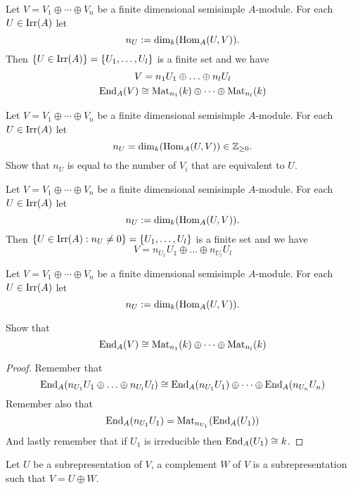 \begin{prop}
Let \(V=V_{1}\oplus \cdots \oplus V_{n}\) be a finite dimensional semisimple \(A\)-module. For each \(U\in \operatorname{Irr}(A)\) let
\[
n_U:=\dim_{k}(\operatorname{Hom}_A(U,V)).
\]
Then \(\{U\in \operatorname{Irr}(A)\}=\{U_{1},\ldots ,U_{l}\}\) is a finite set and we have
\begin{gather*}
V=n_{1}U_{1}\oplus \ldots \oplus n_{l}U_{l} \\
\operatorname{End}_A(V)\cong \operatorname{Mat}_{n_{1}}(k)\oplus \cdots \oplus \operatorname{Mat}_{n_{l}}(k)
\end{gather*}
\end{prop}

\begin{prop}
Let \(V=V_{1}\oplus \cdots \oplus V_{n}\) be a finite dimensional semisimple \(A\)-module. For each \(U\in \operatorname{Irr}(A)\) let
\[
n_U=\dim_{k}(\operatorname{Hom}_A(U,V))\in \Bbb{Z}_{\geq 0}.
\]
Show that \(n_U\) is equal to the number of \(V_{i}\) that are equivalent to \(U\).
\end{prop}

\begin{prop}
Let \(V=V_{1}\oplus \cdots \oplus V_{n}\) be a finite dimensional semisimple \(A\)-module. For each \(U\in \operatorname{Irr}(A)\) let
\[
n_U:=\dim_{k}(\operatorname{Hom}_A(U,V)).
\]
Then \(\{U\in \operatorname{Irr}(A) : n_U\neq 0\}=\{U_{1},\ldots ,U_{l}\}\) is a finite set and we have
\[
V=n_{U_{1}}U_{1}\oplus \ldots \oplus n_{U_{l}}U_{l} 
\]
\end{prop}

\begin{prop}
Let \(V=V_{1}\oplus \cdots \oplus V_{n}\) be a finite dimensional semisimple \(A\)-module. For each \(U\in \operatorname{Irr}(A)\) let
\[
n_U:=\dim_{k}(\operatorname{Hom}_A(U,V)).
\]

Show that
\[
\operatorname{End}_A(V)\cong \operatorname{Mat}_{n_{1}}(k)\oplus \cdots \oplus \operatorname{Mat}_{n_{l}}(k)
\]
\end{prop}

\begin{proof}
Remember that
\[
\operatorname{End}_A(n_{U_{1}}U_{1}\oplus \ldots \oplus n_{U_{l}}U_{l})\cong \operatorname{End}_A(n_{U_{1}}U_{1})\oplus \cdots \oplus \operatorname{End}_A(n_{U_{n}}U_{n})
\]
Remember also that
\[
\operatorname{End}_A(n_{U_{1}}U_{1})=\operatorname{Mat}_{n_{U_{1}}}(\operatorname{End}_A(U_{1}))
\]
And lastly remember that if \(U_{1}\) is irreducible then \(\operatorname{End}_A(U_{1})\cong k\).
\end{proof}

\begin{defn}
Let \(U\) be a subrepresentation of \(V\), a complement \(W\) of \(V\) is a subrepresentation such that \(V=U\oplus W.\)
\end{defn}


